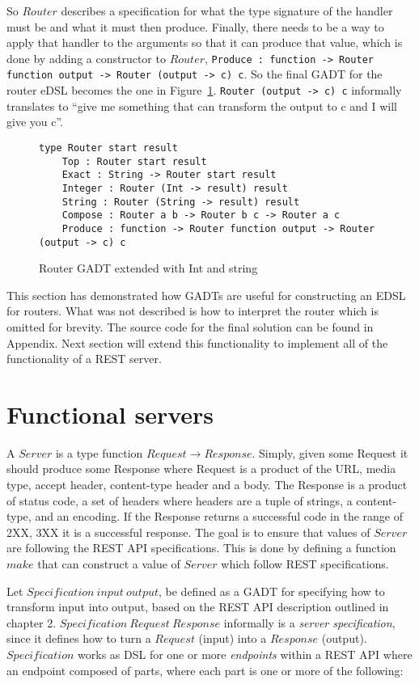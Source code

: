 So $Router$ describes a specification for what the type signature of the handler
must be and what it must then produce. Finally, there needs to be a way to apply
that handler to the arguments so that it can produce that value, which is done
by adding a constructor to $Router$, \texttt{Produce : function -> Router
function output -> Router (output -> c) c}. So the final GADT for the router
eDSL becomes the one in Figure~\ref{finalrouter}. \texttt{Router (output -> c)
c} informally translates to ``give me something that can transform the output to
c and I will give you c''.

\begin{figure}[H]
    \begin{lstlisting}
type Router start result 
    Top : Router start result
    Exact : String -> Router start result
    Integer : Router (Int -> result) result
    String : Router (String -> result) result
    Compose : Router a b -> Router b c -> Router a c
    Produce : function -> Router function output -> Router (output -> c) c
    \end{lstlisting}
    \caption{Router GADT extended with Int and string}
    \label{finalrouter}
\end{figure}

This section has demonstrated how GADTs are useful for constructing an EDSL for
routers. What was not described is how to interpret the router which is omitted
for brevity. The source code for the final solution can be found in Appendix.
Next section will extend this functionality to implement all of the
functionality of a REST server.

\section{Functional servers}

A $Server$ is a type function $Request \rightarrow Response$. Simply, given some
Request it should produce some Response where Request is a product of the URL,
media type, accept header, content-type header and a body.  The Response is a
product of status code, a set of headers where headers are a tuple of strings, a
content-type, and an encoding. If the Response returns a successful code in the
range of 2XX, 3XX it is a successful response. The goal is to ensure that values
of $Server$ are following the REST API specifications.  This is done by defining
a function $make$ that can construct a value of $Server$ which follow REST
specifications.

Let $Specification\ input\ output$, be defined as a GADT for specifying how to
transform input into output, based on the REST API description outlined in
chapter 2.  $Specification\ Request\ Response$ informally is a \textit{server
specification}, since it defines how to turn a $Request$ (input) into a
$Response$ (output). $Specification$ works as DSL for one or more
\textit{endpoints} within a REST API where an endpoint composed of parts, where
each part is one or more of the following:

